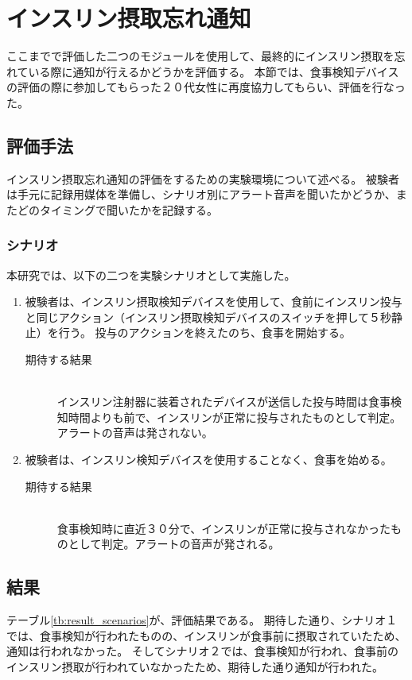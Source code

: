 \section{インスリン摂取忘れ通知}
ここまでで評価した二つのモジュールを使用して、最終的にインスリン摂取を忘れている際に通知が行えるかどうかを評価する。
本節では、食事検知デバイスの評価の際に参加してもらった２０代女性に再度協力してもらい、評価を行なった。

\subsection{評価手法}
インスリン摂取忘れ通知の評価をするための実験環境について述べる。
被験者は手元に記録用媒体を準備し、シナリオ別にアラート音声を聞いたかどうか、またどのタイミングで聞いたかを記録する。

\subsubsection{シナリオ}

本研究では、以下の二つを実験シナリオとして実施した。

\begin{enumerate}
  \item 被験者は、インスリン摂取検知デバイスを使用して、食前にインスリン投与と同じアクション（インスリン摂取検知デバイスのスイッチを押して５秒静止）を行う。
  投与のアクションを終えたのち、食事を開始する。
  \begin{description}
    \item[期待する結果]\mbox{}\\
      インスリン注射器に装着されたデバイスが送信した投与時間は食事検知時間よりも前で、インスリンが正常に投与されたものとして判定。アラートの音声は発されない。
  \end{description}
  \item 被験者は、インスリン検知デバイスを使用することなく、食事を始める。
  \begin{description}
    \item[期待する結果]\mbox{}\\
      食事検知時に直近３０分で、インスリンが正常に投与されなかったものとして判定。アラートの音声が発される。
  \end{description}
\end{enumerate}

\subsection{結果}
テーブル\ref{tb:result_scenarios}が、評価結果である。
期待した通り、シナリオ１では、食事検知が行われたものの、インスリンが食事前に摂取されていたため、通知は行われなかった。
そしてシナリオ２では、食事検知が行われ、食事前のインスリン摂取が行われていなかったため、期待した通り通知が行われた。

